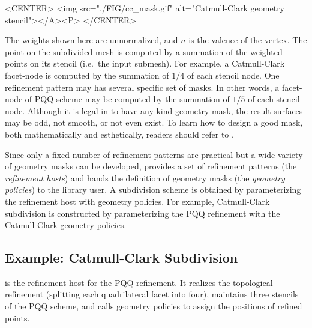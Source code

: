 \begin{ccHtmlOnly}
  <CENTER>
     <img src="./FIG/cc_mask.gif" alt="Catmull-Clark geometry stencil"></A><P>
  </CENTER>
\end{ccHtmlOnly}

The weights shown here are unnormalized, and $n$ is the valence 
of the vertex. 
The point on the subdivided mesh is computed by a summation
of the weighted points on its stencil (i.e.~the input submesh).
For example, a Catmull-Clark facet-node is computed by the summation
of $1/4$ of each stencil node. 
One refinement pattern may has several specific set of masks. In other 
words, a facet-node of PQQ scheme may be computed by the summation
of $1/5$ of each stencil node. Although it is legal in 
 to have any kind geometry mask,
the result surfaces may be odd, not smooth, or not even exist.
To learn how to design a good mask, both mathematically and esthetically, 
readers should refer to \cite{cgal:ww-smgd-02}.


Since only a fixed number of refinement patterns are 
practical but a wide variety of geometry masks can be developed,
 provides a set of refinement patterns 
(the \emph{refinement hosts})
and hands the definition of geometry masks
(the \emph{geometry policies}) to the library user.
A subdivision scheme is obtained by parameterizing the 
refinement host with geometry policies. 
For example, Catmull-Clark subdivision is constructed by 
parameterizing the PQQ refinement with the Catmull-Clark geometry 
policies.



\subsection{Example: Catmull-Clark Subdivision}
 is the refinement 
host for the PQQ refinement. It realizes the topological 
refinement (splitting each quadrilateral facet into four), 
maintains three stencils of the 
PQQ scheme, and calls geometry policies to assign the positions
of refined points.

